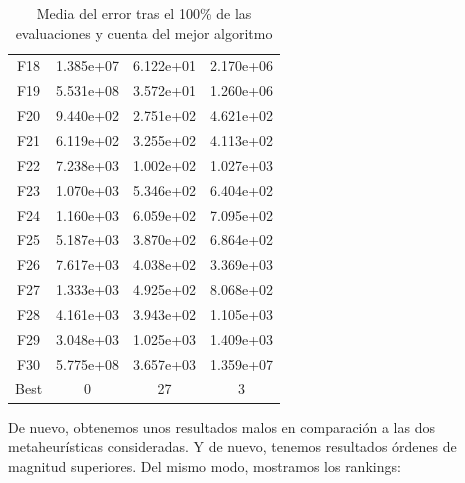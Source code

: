 \documentclass[11pt]{article}
\begin{document}
\begin{table}[H]
\begin{tabular}{|c|c|c|c|}
F18  &     1.385e+07 &  6.122e+01 &  2.170e+06 \\
F19  &     5.531e+08 &  3.572e+01 &  1.260e+06 \\
F20  &     9.440e+02 &  2.751e+02 &  4.621e+02 \\
F21  &     6.119e+02 &  3.255e+02 &  4.113e+02 \\
F22  &     7.238e+03 &  1.002e+02 &  1.027e+03 \\
F23  &     1.070e+03 &  5.346e+02 &  6.404e+02 \\
F24  &     1.160e+03 &  6.059e+02 &  7.095e+02 \\
F25  &     5.187e+03 &  3.870e+02 &  6.864e+02 \\
F26  &     7.617e+03 &  4.038e+02 &  3.369e+03 \\
F27  &     1.333e+03 &  4.925e+02 &  8.068e+02 \\
F28  &     4.161e+03 &  3.943e+02 &  1.105e+03 \\
F29  &     3.048e+03 &  1.025e+03 &  1.409e+03 \\
F30  &     5.775e+08 &  3.657e+03 &  1.359e+07 \\
Best &             0 &         27 &          3 \\
\hline
\end{tabular}
    \caption{Media del error tras el 100\% de las evaluaciones y cuenta del mejor algoritmo}
    \label{errores_30_standar}
\end{table}

De nuevo, obtenemos unos resultados malos en comparación a las dos metaheurísticas consideradas. Y de nuevo, tenemos resultados órdenes de magnitud superiores. Del mismo modo, mostramos los rankings:
\end{document}
